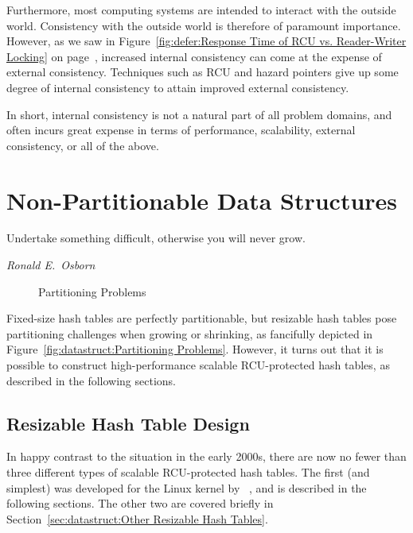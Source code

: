 Furthermore, most computing systems are intended to interact with
the outside world.
Consistency with the outside world is therefore of paramount importance.
However, as we saw in
Figure~\ref{fig:defer:Response Time of RCU vs. Reader-Writer Locking}
on
page~\pageref{fig:defer:Response Time of RCU vs. Reader-Writer Locking},
increased internal consistency can come at the expense of external
consistency.
Techniques such as RCU and hazard pointers give up some degree of
internal consistency to attain improved external consistency.

In short, internal consistency is not a natural part of all problem domains,
and often incurs great expense in terms of performance,
scalability, external consistency, or all of the above.

\section{Non-Partitionable Data Structures}
\label{sec:datastruct:Non-Partitionable Data Structures}
%
\epigraph{Undertake something difficult, otherwise you will never grow.}
	 {\emph{Ronald E.~Osborn}}

\begin{figure}[tb]
\centering
{}
\caption{Partitioning Problems}
\end{figure}

Fixed-size hash tables are perfectly partitionable, but resizable hash
tables pose partitioning challenges when growing or shrinking, as
fancifully depicted in
Figure~\ref{fig:datastruct:Partitioning Problems}.
However, it turns out that it is possible to construct high-performance
scalable RCU-protected hash tables, as described in the following sections.

\subsection{Resizable Hash Table Design}
\label{sec:datastruct:Resizable Hash Table Design}

In happy contrast to the situation in the early 2000s, there are now
no fewer than three different types of scalable RCU-protected hash
tables.
The first (and simplest) was developed for the Linux kernel by
~\cite{HerbertXu2010RCUResizeHash}, and is described in the
following sections.
The other two are covered briefly in
Section~\ref{sec:datastruct:Other Resizable Hash Tables}.

